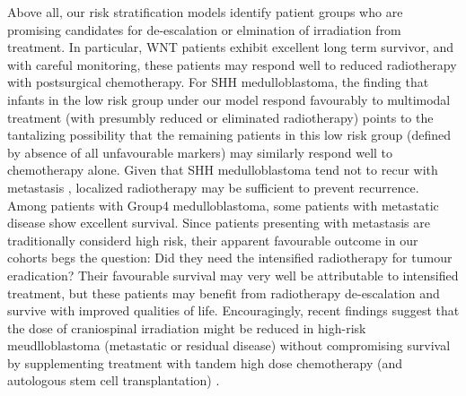 Above all, our risk stratification models identify patient groups who are promising candidates for de-escalation or elmination of irradiation from treatment. In particular, WNT patients exhibit excellent long term survivor, and with careful monitoring, these patients may respond well to reduced radiotherapy with postsurgical chemotherapy. For SHH medulloblastoma, the finding that infants in the low risk group under our model respond favourably to multimodal treatment (with presumbly reduced or eliminated radiotherapy) points to the tantalizing possibility that the remaining patients in this low risk group (defined by absence of all unfavourable markers) may similarly respond well to chemotherapy alone. Given that SHH medulloblastoma tend not to recur with metastasis , localized radiotherapy may be sufficient to prevent recurrence. Among patients with Group4 medulloblastoma, some patients with metastatic disease show excellent survival. Since patients presenting with metastasis are traditionally considerd high risk, their apparent favourable outcome in our cohorts begs the question: Did they need the intensified radiotherapy for tumour eradication? Their favourable survival may very well be attributable to intensified treatment, but these patients may benefit from radiotherapy de-escalation and survive with improved qualities of life. Encouragingly, recent findings suggest that the dose of craniospinal irradiation might be reduced in high-risk meudlloblastoma (metastatic or residual disease) without compromising survival by supplementing treatment with tandem high dose chemotherapy (and autologous stem cell transplantation) .

